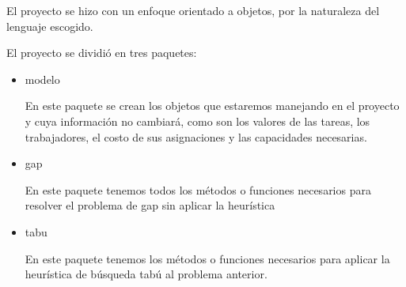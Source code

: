 \documentclass{article}
\begin{document}
El proyecto se hizo con un enfoque orientado a objetos, por la naturaleza del lenguaje escogido. 

El proyecto se dividió en tres paquetes: 
\begin{itemize}
	\item modelo
	
	En este paquete se crean los objetos que estaremos manejando en el proyecto y cuya información no cambiará, como son los valores de las tareas, los trabajadores, el costo de sus asignaciones y las capacidades necesarias.
	
	\item gap
	
	En este paquete tenemos todos los métodos o funciones necesarios para resolver el problema de gap sin aplicar la heurística
	
	\item tabu
	
	En este paquete tenemos los métodos o funciones necesarios para aplicar la heurística de búsqueda tabú al problema anterior.
\end{itemize}
\end{document}
